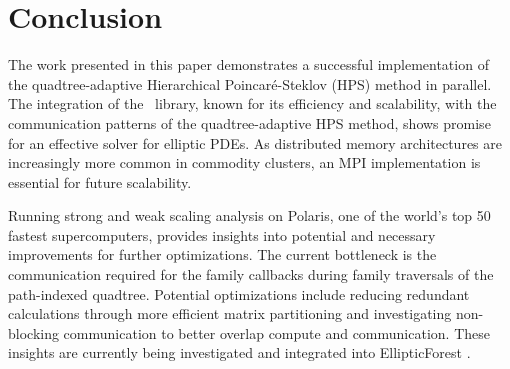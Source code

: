 \section{Conclusion}

The work presented in this paper demonstrates a successful implementation of the quadtree-adaptive Hierarchical Poincaré-Steklov (HPS) method in parallel. The integration of the \pforest\ library, known for its efficiency and scalability, with the communication patterns of the quadtree-adaptive HPS method, shows promise for an effective solver for elliptic PDEs. As distributed memory architectures are increasingly more common in commodity clusters, an MPI implementation is essential for future scalability.

Running strong and weak scaling analysis on Polaris, one of the world's top 50 fastest supercomputers, provides insights into potential and necessary improvements for further optimizations. The current bottleneck is the communication required for the family callbacks during family traversals of the path-indexed quadtree. Potential optimizations include reducing redundant calculations through more efficient matrix partitioning and investigating non-blocking communication to better overlap compute and communication. These insights are currently being investigated and integrated into EllipticForest \cite{chipman2024ellipticforest}.